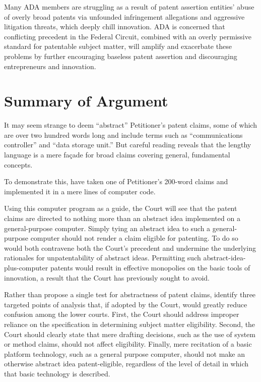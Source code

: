 \documentclass{scotus}
\begin{document}
Many ADA members are struggling as a result of patent assertion entities’ abuse
of overly broad patents via unfounded infringement allegations and aggressive
litigation threats, which deeply chill innovation. ADA is concerned that
conflicting precedent in the Federal Circuit, combined with an overly permissive
standard for patentable subject matter, will amplify and exacerbate these
problems by further encouraging baseless patent assertion and discouraging
entrepreneurs and innovation. 


\clearpage

\part{Summary of Argument}

It may seem strange to deem ``abstract'' Petitioner's patent claims, some of
which are over two hundred words long and include terms such as ``communications
controller'' and ``data storage unit.'' But careful reading reveals that the
lengthy language is a mere fa\c cade for broad claims covering general,
fundamental concepts.

To demonstrate this, \amici have taken one of Petitioner's 200-word claims and
implemented it in a mere \numlines lines of computer code.

Using this computer program as a guide, the Court will see that the patent
claims are directed to nothing more than an abstract idea implemented on a
general-purpose computer.
%
Simply tying an abstract idea to such a general-purpose computer should not
render a claim eligible for patenting. To do so would both contravene both the
Court's precedent and undermine the underlying rationales for unpatentability of
abstract ideas. Permitting such abstract-idea-plus-computer patents would result
in effective monopolies on the basic tools of innovation, a result that the
Court has previously sought to avoid.

Rather than propose a single test for abstractness of patent claims, \amici
identify three targeted points of analysis that, if adopted by the Court, would
greatly reduce confusion among the lower courts. First, the Court should address
improper reliance on the specification in determining subject matter
eligibility. Second, the Court should clearly state that mere drafting
decisions, such as the use of system or method claims, should not affect
eligibility. Finally, mere recitation of a basic platform technology, such as a
general purpose computer, should not make an otherwise abstract idea
patent-eligible, regardless of the level of detail in which that basic
technology is described.
\end{document}
